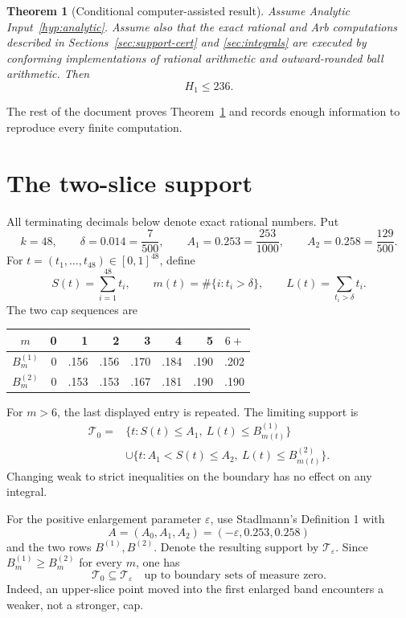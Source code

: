 \documentclass[11pt]{article}
\newtheorem{theorem}{Theorem}
\theoremstyle{definition}
\theoremstyle{remark}
\newcommand{\TT}{\mathcal T}
\newcommand{\eps}{\varepsilon}
\begin{document}
\begin{theorem}[Conditional computer-assisted result]
\label{thm:main}
Assume Analytic Input~\ref{hyp:analytic}.  Assume also that the exact rational
and Arb computations described in Sections~\ref{sec:support-cert} and
\ref{sec:integrals} are executed by conforming implementations of rational
arithmetic and outward-rounded ball arithmetic.  Then
\[
  \boxed{H_1\leq236}.
\]
\end{theorem}

The rest of the document proves Theorem~\ref{thm:main} and records enough
information to reproduce every finite computation.

\section{The two-slice support}
\label{sec:support}

All terminating decimals below denote exact rational numbers.  Put
\begin{equation}
\label{eq:parameters}
 k=48,\qquad \delta=0.014=\frac7{500},\qquad
 A_1=0.253=\frac{253}{1000},\qquad
 A_2=0.258=\frac{129}{500}.
\end{equation}
For \(t=(t_1,\ldots,t_{48})\in[0,1]^{48}\), define
\[
 S(t)=\sum_{i=1}^{48}t_i,\qquad
 m(t)=\#\{i:t_i>\delta\},\qquad
 L(t)=\sum_{t_i>\delta}t_i.
\]
The two cap sequences are
\begin{center}
\begin{tabular}{c|rrrrrrr}
\toprule
\(m\) & 0&1&2&3&4&5&\(6+\)\\
\midrule
\(B^{(1)}_m\) &0&.156&.156&.170&.184&.190&.202\\
\(B^{(2)}_m\) &0&.153&.153&.167&.181&.190&.190\\
\bottomrule
\end{tabular}
\end{center}
For \(m>6\), the last displayed entry is repeated.  The limiting support is
\begin{equation}
\label{eq:T0}
\begin{split}
 \TT_0={}&\{t:S(t)\leq A_1,\ L(t)\leq B^{(1)}_{m(t)}\}\\
 &\cup\{t:A_1<S(t)\leq A_2,\ L(t)\leq B^{(2)}_{m(t)}\}.
\end{split}
\end{equation}
Changing weak to strict inequalities on the boundary has no effect on any
integral.

For the positive enlargement parameter \(\eps\), use Stadlmann's Definition 1
with
\[
 A=(A_0,A_1,A_2)=(-\eps,0.253,0.258)
\]
and the two rows \(B^{(1)},B^{(2)}\).  Denote the resulting support by
\(\TT_\eps\).  Since \(B^{(1)}_m\geq B^{(2)}_m\) for every \(m\), one has
\begin{equation}
\label{eq:nesting}
 \TT_0\subseteq\TT_\eps\quad\text{up to boundary sets of measure zero.}
\end{equation}
Indeed, an upper-slice point moved into the first enlarged band encounters a
weaker, not a stronger, cap.
\end{document}
